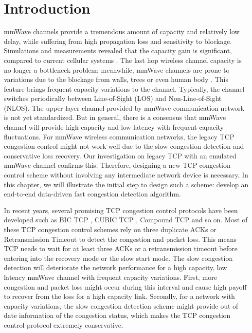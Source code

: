 \section{Introduction}
\par  mmWave channels provide a tremendous amount of capacity and relatively low delay, while suffering from high propagation loss and sensitivity to blockage. Simulations and measurements revealed that the capacity gain is significant, compared to current cellular systems \cite{akdeniz2014millimeter,bai2015coverage}. The last hop wireless channel capacity is no longer a bottleneck problem; meanwhile, mmWave channels are prone to variations due to the blockage from walls, trees or even human body \cite{lu2012modeling, zhao201328, alejos2008measurement}. This feature brings frequent capacity variations to the channel. Typically, the channel switches periodically between Line-of-Sight (LOS) and Non-Line-of-Sight (NLOS). The upper layer channel provided by mmWave communication network is not yet standardized. But in general, there is a consensus that mmWave channel will provide high capacity and low latency with frequent capacity fluctuations. For mmWave wireless communication networks, the legacy TCP congestion control might not work well due to the slow congestion detection and conservative loss recovery. Our investigation on legacy TCP with an emulated mmWave channel confirms this. Therefore, designing a new TCP congestion control scheme without involving any intermediate network device is necessary. In this chapter, we will illustrate the initial step to design such a scheme: develop an end-to-end data-driven fast congestion detection algorithm.
\par In recent years, several promising TCP congestion control protocols have been developed such as BIC TCP \cite{xu2004binary}, CUBIC TCP \cite{ha2008cubic}, Compound TCP \cite{tan2006compound} and so on. Most of these TCP congestion control schemes rely on three duplicate ACKs or Retransmission Timeout to detect the congestion and packet loss. This means TCP needs to wait for at least three ACKs or a retransmission timeout before entering into the recovery mode or the slow start mode. The slow congestion detection will deteriorate the network performance for a high capacity, low latency mmWave channel with frequent capacity variations. First, more congestion and packet loss might occur during this interval and cause high payoff to recover from the loss for a high capacity link. Secondly, for a network with capacity variations, the slow congestion detection scheme might provide out of date information of the congestion status, which makes the TCP congestion control protocol extremely conservative.

